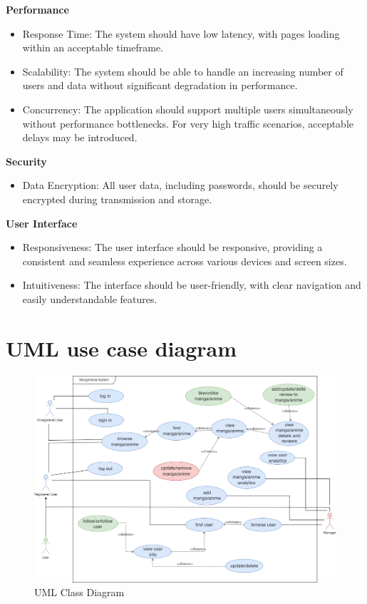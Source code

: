 \textbf{Performance}

\begin{itemize}
    \item Response Time: The system should have low latency, with pages loading within an acceptable timeframe.
    \item Scalability: The system should be able to handle an increasing number of users and data without significant degradation in performance.
    \item Concurrency: The application should support multiple users simultaneously without performance bottlenecks. For very high traffic scenarios, acceptable delays may be introduced.
\end{itemize}

\textbf{Security}

\begin{itemize}
    \item Data Encryption: All user data, including passwords, should be securely encrypted during transmission and storage.
\end{itemize}

\textbf{User Interface}

\begin{itemize}
    \item Responsiveness: The user interface should be responsive, providing a consistent and seamless experience across various devices and screen sizes.
    \item Intuitiveness: The interface should be user-friendly, with clear navigation and easily understandable features.
\end{itemize}

\section{UML use case diagram}
\begin{figure}[h]
    \centering
    \includegraphics[width=\linewidth]{Media/use_case.png}
    \caption{UML Class Diagram}
    \label{uml class diagram}
\end{figure}

